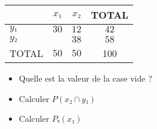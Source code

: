 \documentclass{automatisme}
\begin{document}
\begin{frame}
	\renewcommand{\arraystretch}{1.3}
	\begin{center}
		\begin{tabular}{|l|c|c|c|}
			\hline
			      & $x₁$              & $x₂$ & TOTAL \\ \hline
			$y₁$  & $30$              & $12$ & $42$  \\ \hline
			$y₂$  & $\correction{20}$ & $38$ & $58$  \\ \hline
			TOTAL & $50$              & $50$ & 100   \\ \hline
		\end{tabular}
	\end{center}

	\begin{itemize}
		\item Quelle est la valeur de la case vide ?
		\item Calculer $P(x₂ ∩ y₁)$
		\item Calculer $Pₓ(x₁)$
	\end{itemize}
\end{frame}
\end{document}
